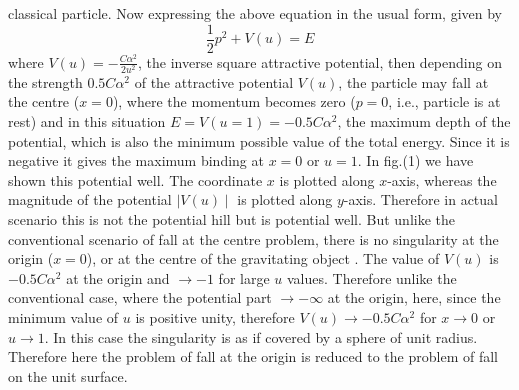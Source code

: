 \documentclass[12pt]{article}
\begin{document}
classical particle. Now expressing the above equation  in the usual form, given by
  \begin{equation} 
 \frac{1}{2} p^2+V(u)=E
 \end{equation}
where $V(u)=-\frac{C\alpha^2}{2u^2}$, the inverse square attractive potential, then depending on the
strength $0.5 C\alpha^2$ of the attractive potential $V(u)$, the particle may fall at the centre
($x=0$), where the momentum becomes zero ($p=0$, i.e., particle is at rest) and in this
situation $E=V(u=1)=-0.5 C\alpha^2$, the maximum depth of the potential, which is also the
minimum possible value of the total energy. Since it is negative it gives the maximum binding
at $x=0$ or $u=1$.  In fig.(1) we have shown this potential well. The coordinate $x$ is
plotted along $x$-axis, whereas the magnitude of the potential $\mid V(u)\mid$ is
plotted along $y$-axis. Therefore in actual scenario this is not the potential hill but is
potential well. But unlike the conventional scenario of fall at the centre problem, there is
no singularity at the origin ($x=0$), or at the centre of the gravitating object \cite{R13,R14,R15}. The value
of $V(u)$ is $-0.5C\alpha^2$ at the origin and $\longrightarrow -1$ for large $u$ values.
Therefore unlike the conventional case, where the potential part $\longrightarrow -\infty$ at the origin, here, 
since the minimum value of $u$ is positive unity, therefore $V(u)\rightarrow -0.5C\alpha^2$ for
$x\longrightarrow 0$ or $u\longrightarrow 1$. 
In this case the singularity is as if covered by a sphere of unit radius. Therefore here the problem of fall at 
the origin is reduced to the problem of fall on the unit surface. 
\end{document}
